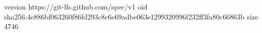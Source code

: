 version https://git-lfs.github.com/spec/v1
oid sha256:4e886bf063260f86fd293c8c6e69adbe063e1299320996f232ff3fa80c66863b
size 4746
